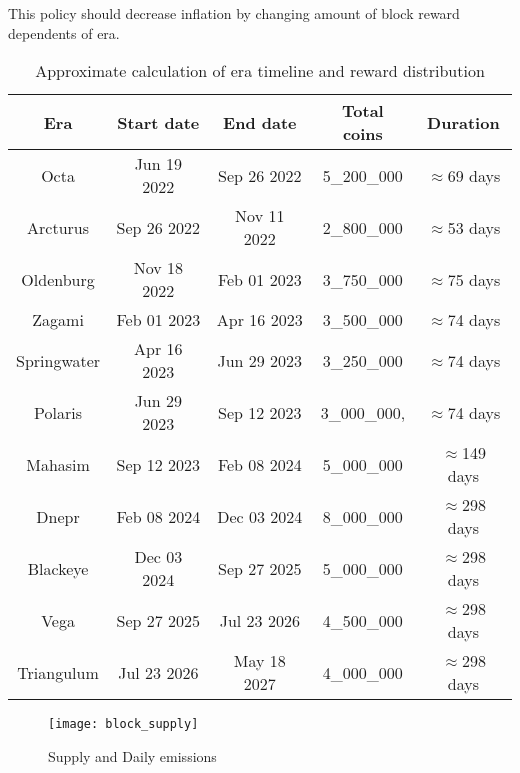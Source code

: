 This policy should decrease inflation by changing amount of block reward dependents of era.

\newpage

\begin{table}[h!]
\centering
\begin{tabular}{||c c c c c||}
    \hline
        Era & Start date & End date & Total coins & Duration \\ [0.5ex]

        \hline\hline
        Octa & Jun 19 2022 & Sep 26 2022 & 5\_200\_000 & $\approx$69 days \\
        Arcturus & Sep 26 2022 & Nov 11 2022 & 2\_800\_000 & $\approx$53 days \\
        Oldenburg & Nov 18 2022 & Feb 01 2023 & 3\_750\_000 & $\approx$75 days \\
        Zagami & Feb 01 2023 & Apr 16 2023 &  3\_500\_000 & $\approx$74 days \\
        Springwater & Apr 16 2023 & Jun 29 2023 & 3\_250\_000 & $\approx$74 days \\
        Polaris & Jun 29 2023 & Sep 12 2023 & 3\_000\_000, & $\approx$74 days \\
        Mahasim & Sep 12 2023 & Feb 08 2024 & 5\_000\_000 & $\approx$149 days \\
        Dnepr & Feb 08 2024 & Dec 03 2024 & 8\_000\_000 & $\approx$298 days \\
        Blackeye & Dec 03 2024 & Sep 27 2025 & 5\_000\_000 & $\approx$298 days \\
        Vega & Sep 27 2025 & Jul 23 2026 & 4\_500\_000 & $\approx$298 days \\
        Triangulum & Jul 23 2026 & May 18 2027 & 4\_000\_000 & $\approx$298 days \\[1ex]
    \hline

\end{tabular}
\caption{Approximate calculation of era timeline and reward distribution}
\label{table:1}
\end{table}

\begin{figure}[ht]
    \centering
    \texttt{[image: block\_supply]}
    \caption{Supply and Daily emissions}
\end{figure}
